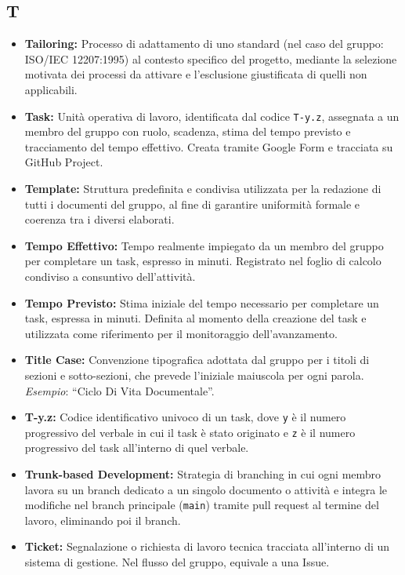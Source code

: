 \subsection*{T}
\begin{itemize}[leftmargin=*]
    \item \textbf{Tailoring:} Processo di adattamento di uno standard (nel caso del
          gruppo: ISO/IEC 12207:1995) al contesto specifico del progetto, mediante
          la selezione motivata dei processi da attivare e l'esclusione giustificata
          di quelli non applicabili.
    \item \textbf{Task:} Unità operativa di lavoro, identificata dal codice
          \texttt{T-y.z}, assegnata a un membro del gruppo con ruolo, scadenza,
          stima del tempo previsto e tracciamento del tempo effettivo. Creata
          tramite Google Form e tracciata su GitHub Project.
    \item \textbf{Template:} Struttura predefinita e condivisa utilizzata per la
          redazione di tutti i documenti del gruppo, al fine di garantire uniformità
          formale e coerenza tra i diversi elaborati.
    \item \textbf{Tempo Effettivo:} Tempo realmente impiegato da un membro del
          gruppo per completare un task, espresso in minuti. Registrato nel foglio
          di calcolo condiviso a consuntivo dell'attività.
    \item \textbf{Tempo Previsto:} Stima iniziale del tempo necessario per
          completare un task, espressa in minuti. Definita al momento della
          creazione del task e utilizzata come riferimento per il monitoraggio
          dell'avanzamento.
    \item \textbf{Title Case:} Convenzione tipografica adottata dal gruppo per i
          titoli di sezioni e sotto-sezioni, che prevede l'iniziale maiuscola per
          ogni parola. \textit{Esempio}: ``Ciclo Di Vita Documentale''.
    \item \textbf{T-y.z:} Codice identificativo univoco di un task, dove \texttt{y}
          è il numero progressivo del verbale in cui il task è stato originato e
          \texttt{z} è il numero progressivo del task all'interno di quel verbale.
    \item \textbf{Trunk-based Development:} Strategia di branching in cui ogni
          membro lavora su un branch dedicato a un singolo documento o attività e
          integra le modifiche nel branch principale (\texttt{main}) tramite pull
          request al termine del lavoro, eliminando poi il branch.
      \item \textbf{Ticket:} Segnalazione o richiesta di lavoro tecnica tracciata all'interno di un sistema di gestione. Nel flusso del gruppo, equivale a una Issue.
\end{itemize}
 

